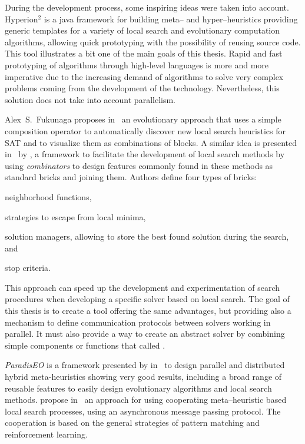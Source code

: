During the development process, some inspiring ideas were taken into account. {\sc Hyperion}$^2$ \cite{Brownlee2014} is a java framework for building meta-- and hyper--heuristics providing generic templates for a variety of local search and evolutionary computation algorithms, allowing quick prototyping with the possibility of reusing source code. This tool illustrates a bit one of the main goals of this thesis. Rapid and fast prototyping of algorithms through high-level languages is more and more imperative due to the increasing demand of algorithms to solve very complex problems coming from the development of the technology. Nevertheless, this solution does not take into account parallelism.

Alex~S.~Fukunaga proposes in~\cite{Fukunaga2008} an evolutionary approach that uses a simple composition operator to automatically discover new local search heuristics for SAT and to visualize them as combinations of blocks. A similar idea is presented in~\cite{Landtsheer2015} by , a framework to facilitate the development of local search methods by using \textit{combinators} to design features commonly found in these methods as standard bricks and joining them. Authors define four types of bricks: \begin{inparaenum}[1-] \item neighborhood functions, \item strategies to escape from local minima, \item solution managers, allowing to store the best found solution during the search, and \item stop criteria.
\end{inparaenum} This approach can speed up the development and experimentation of search procedures when developing a specific solver based on local search. The goal of this thesis is to create a tool offering the same advantages, but providing also a mechanism to define communication protocols between solvers working in parallel. It must also provide a way to create an abstract solver by combining simple components or functions that called \ms.

{\it ParadisEO} is a framework presented by  in~\cite{Cahon2004} to design parallel and distributed hybrid meta-heuristics showing very good results, including a broad range of reusable features to easily design evolutionary algorithms and local search methods.  propose in~\cite{Martin2016} an approach for using cooperating meta--heuristic based local search processes, using an asynchronous message passing protocol. The cooperation is based on the general strategies of pattern matching and reinforcement learning. 

